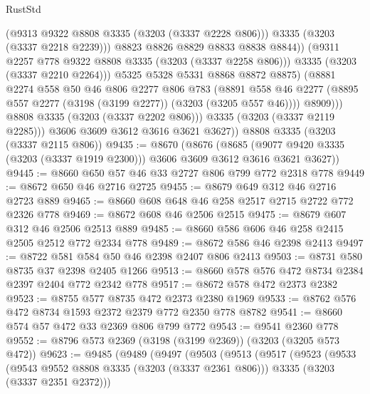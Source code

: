 \begin{lexlean}{RustStd}
\begin{coremodule}
                          (@9313 @9322 @8808 @3335 (@3203 (@3337 @2228 @806)))
                          @3335
                          (@3203 (@3337 @2218 @2239)))
                        @8823
                        @8826
                        @8829
                        @8833
                        @8838
                        @8844))
                    (@9311 @2257 @778 @9322 @8808 @3335 (@3203 (@3337 @2258 @806)))
                    @3335
                    (@3203 (@3337 @2210 @2264)))
                  @5325
                  @5328
                  @5331
                  @8868
                  @8872
                  @8875)
                (@8881
                  @2274
                  @558
                  @50
                  @46
                  @806
                  @2277
                  @806
                  @783
                  (@8891
                    @558
                    @46
                    @2277
                    (@8895 @557 @2277 (@3198 (@3199 @2277)) (@3203 (@3205 @557 @46))))
                  @8909)))
            @8808
            @3335
            (@3203 (@3337 @2202 @806)))
          @3335
          (@3203 (@3337 @2119 @2285)))
        @3606
        @3609
        @3612
        @3616
        @3621
        @3627))
    @8808
    @3335
    (@3203 (@3337 @2115 @806))
@9435 := @8670
    (@8676
      (@8685 (@9077 @9420 @3335 (@3203 (@3337 @1919 @2300))) @3606 @3609 @3612 @3616 @3621 @3627))
@9445 := @8660 @650 @57 @46 @33 @2727 @806 @799 @772 @2318 @778
@9449 := @8672 @650 @46 @2716 @2725
@9455 := @8679 @649 @312 @46 @2716 @2723 @889
@9465 := @8660 @608 @648 @46 @258 @2517 @2715 @2722 @772 @2326 @778
@9469 := @8672 @608 @46 @2506 @2515
@9475 := @8679 @607 @312 @46 @2506 @2513 @889
@9485 := @8660 @586 @606 @46 @258 @2415 @2505 @2512 @772 @2334 @778
@9489 := @8672 @586 @46 @2398 @2413
@9497 := @8722 @581 @584 @50 @46 @2398 @2407 @806 @2413
@9503 := @8731 @580 @8735 @37 @2398 @2405 @1266
@9513 := @8660 @578 @576 @472 @8734 @2384 @2397 @2404 @772 @2342 @778
@9517 := @8672 @578 @472 @2373 @2382
@9523 := @8755 @577 @8735 @472 @2373 @2380 @1969
@9533 := @8762 @576 @472 @8734 @1593 @2372 @2379 @772 @2350 @778 @8782
@9541 := @8660 @574 @57 @472 @33 @2369 @806 @799 @772
@9543 := @9541 @2360 @778
@9552 := @8796 @573 @2369 (@3198 (@3199 @2369)) (@3203 (@3205 @573 @472))
@9623 := @9485
    (@9489
      (@9497
        (@9503
          (@9513
            (@9517
              (@9523
                (@9533
                  (@9543 @9552 @8808 @3335 (@3203 (@3337 @2361 @806)))
                  @3335
                  (@3203 (@3337 @2351 @2372)))

\end{coremodule}
\end{lexlean}
